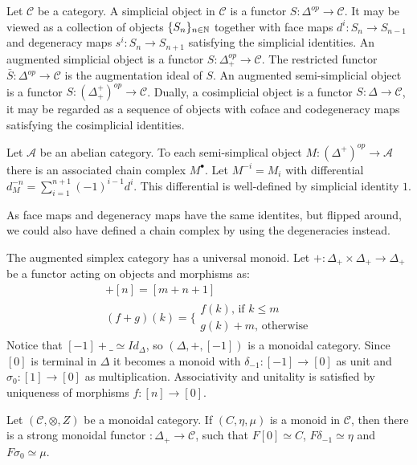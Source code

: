 \documentclass[../thesis.tex]{subfiles}
\begin{document}
            Let $\mathcal{C}$ be a category. A simplicial object in $\mathcal{C}$ is a functor $S:\Delta^{op}\rightarrow \mathcal{C}$. It may be viewed as a collection of objects $\{S_n\}_{n\in\mathbb{N}}$ together with face maps $d^i:S_n\rightarrow S_{n-1}$ and degeneracy maps $s^i:S_n \rightarrow S_{n+1}$ satisfying the simplicial identities. An augmented simplicial object is a functor $S:\Delta_+^{op}\rightarrow \mathcal{C}$. The restricted functor $\bar{S}:\Delta^{op}\rightarrow \mathcal{C}$ is the augmentation ideal of $S$. An augmented semi-simplicial object is a functor $S:(\Delta_+^+)^{op}\rightarrow \mathcal{C}$. Dually, a cosimplicial object is a functor $S:\Delta\rightarrow \mathcal{C}$, it may be regarded as a sequence of objects with coface and codegeneracy maps satisfying the cosimplicial identities.
            
            Let $\mathcal{A}$ be an abelian category. To each semi-simplical object $M:(\Delta^+)^{op}\rightarrow \mathcal{A}$ there is an associated chain complex $M^\bullet$. Let $M^{-i} = M_i$ with differential $d_M^{-n} = \sum_{i=1}^{n+1} (-1)^{i-1}d^i$. This differential is well-defined by simplicial identity $1$.
            \begin{center}
            \end{center}
            As face maps and degeneracy maps have the same identites, but flipped around, we could also have defined a chain complex by using the degeneracies instead.

            The augmented simplex category has a universal monoid. Let $+:\Delta_+ \times \Delta_+ \rightarrow \Delta_+$ be a functor acting on objects and morphisms as:
            \begin{align*}
                [m]+[n] = [m+n+1] \\
                (f+g)(k) = \biggl\{\substack{f(k)\text{, if }k\leq m \\ g(k)+m\text{, otherwise}}
            \end{align*}
            Notice that $[-1]+\_\simeq Id_\Delta$, so $(\Delta, +, [-1])$ is a monoidal category. Since $[0]$ is terminal in $\Delta$ it becomes a monoid with $\delta_{-1}: [-1]\rightarrow [0]$ as unit and $\sigma_0:[1]\rightarrow [0]$ as multiplication. Associativity and unitality is satisfied by uniqueness of morphisms $f:[n]\rightarrow [0]$.
            \begin{proposition}\label{prop: universal-monoid}
                Let $(\mathcal{C}, \otimes, Z)$ be a monoidal category. If $(C, \eta, \mu)$ is a monoid in $\mathcal{C}$, then there is a strong monoidal functor $:\Delta_+\rightarrow \mathcal{C}$, such that $F[0] \simeq C$, $F\delta_{-1} \simeq \eta$ and $F\sigma_0 \simeq \mu$.
            \end{proposition} 
\end{document}
